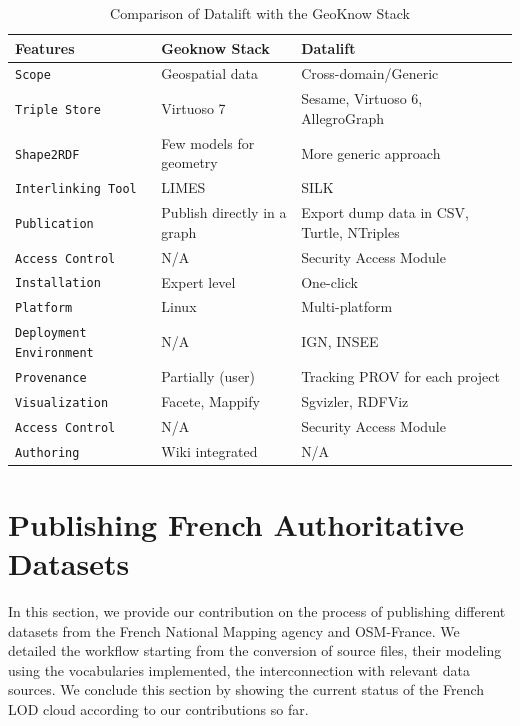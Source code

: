 \begin{table}[ht!bp]
   
    \small
    \center
    \begin{tabularx}{\textwidth}{@{}llX@{}}
    \toprule
    \textbf{Features} 		& \textbf{Geoknow Stack } &  \textbf{Datalift} \\
    \toprule
    \texttt{Scope} 	& Geospatial data & Cross-domain/Generic\\
    \midrule
    \texttt{Triple Store} & Virtuoso 7 & Sesame, Virtuoso 6, AllegroGraph\\
    \midrule
    \texttt{Shape2RDF} &  Few models for geometry & More generic approach\\
    \midrule
    \texttt{Interlinking Tool} & LIMES & SILK \\
    \midrule
    \texttt{Publication} & Publish directly in a graph & Export dump data in CSV, Turtle, NTriples\\
    \midrule
    \texttt{Access Control} & N/A & Security Access Module\\
    \midrule
    \texttt{Installation} & Expert level & One-click\\
    \midrule
    \texttt{Platform} & Linux & Multi-platform\\
    \midrule
    \texttt{Deployment Environment} & N/A & IGN, INSEE\\
    \midrule
    \texttt{Provenance} & Partially (user) & Tracking PROV for each project\\
    \midrule
    \texttt{Visualization} & Facete, Mappify  & Sgvizler, RDFViz\\
    \midrule
    \texttt{Access Control} & N/A & Security Access Module\\
    \midrule
    \texttt{Authoring} & Wiki integrated & N/A\\
    \bottomrule

    \end{tabularx}
     \caption{Comparison of Datalift with the GeoKnow Stack} \label{tab:gknow-datalift}
    \end{table}


\section{Publishing French Authoritative Datasets} \label{sec:publishing}

In this section, we provide our contribution on the process of publishing different datasets from the French National Mapping agency and OSM-France. We detailed the workflow starting from the conversion of source files, their modeling using the vocabularies implemented, the interconnection with relevant data sources. We conclude this section by showing the current status of the French LOD cloud according to our contributions so far.

